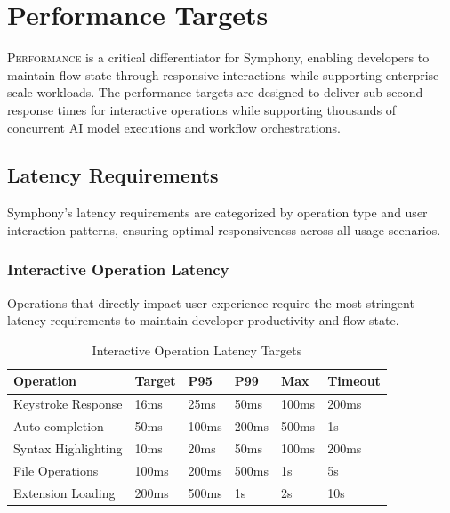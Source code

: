 
\section*{Performance Targets}

\lettrine{P}{erformance} is a critical differentiator for Symphony, enabling developers to maintain flow state through responsive interactions while supporting enterprise-scale workloads. The performance targets are designed to deliver sub-second response times for interactive operations while supporting thousands of concurrent AI model executions and workflow orchestrations.

\subsection*{Latency Requirements}

Symphony's latency requirements are categorized by operation type and user interaction patterns, ensuring optimal responsiveness across all usage scenarios.

\subsubsection*{Interactive Operation Latency}

Operations that directly impact user experience require the most stringent latency requirements to maintain developer productivity and flow state.

\begin{table}[h]
\centering
\caption{Interactive Operation Latency Targets}
\label{tab:interactive-latency}
\begin{tabular}{@{}llllll@{}}
\toprule
\textbf{Operation} & \textbf{Target} & \textbf{P95} & \textbf{P99} & \textbf{Max} & \textbf{Timeout} \\
\midrule
Keystroke Response & 16ms & 25ms & 50ms & 100ms & 200ms \\
Auto-completion & 50ms & 100ms & 200ms & 500ms & 1s \\
Syntax Highlighting & 10ms & 20ms & 50ms & 100ms & 200ms \\
File Operations & 100ms & 200ms & 500ms & 1s & 5s \\
Extension Loading & 200ms & 500ms & 1s & 2s & 10s \\
\bottomrule
\end{tabular}
\end{table}

